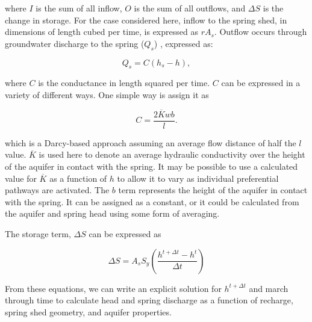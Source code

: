 \documentclass[11pt]{amsart}
\begin{document}
\noindent where $I$ is the sum of all inflow, $O$ is the sum of all outflows, and $\Delta S$ is the change in storage.  For the case considered here, inflow to the spring shed, in dimensions of length cubed per time, is expressed as $r A_s$.  Outflow occurs through groundwater discharge to the spring ($Q_s$) , expressed as:

\begin{equation}
Q_s = C \left ( h_s - h \right ),
\end{equation}

\noindent where $C$ is the conductance in length squared per time.  $C$ can be expressed in a variety of different ways.  One simple way is assign it as

\begin{equation}
C = \frac{2 \overline{K} w b}{l}.
\end{equation}

\noindent which is a Darcy-based approach assuming an average flow distance of half the $l$ value.  $\overline{K}$ is used here to denote an average hydraulic conductivity over the height of the aquifer in contact with the spring.  It may be possible to use a calculated value for $\overline{K}$ as a function of $h$ to allow it to vary as individual preferential pathways are activated.  The $b$ term represents the height of the aquifer in contact with the spring.  It can be assigned as a constant, or it could be calculated from the aquifer and spring head using some form of averaging.

The storage term, $\Delta S$ can be expressed as

\begin{equation}
\Delta S = A_s S_y \left ( \frac{h^{t + \Delta t} - h^t}{\Delta t} \right )
\end{equation}

From these equations, we can write an explicit solution for $h^{t + \Delta t}$ and march through time to calculate head and spring discharge as a function of recharge, spring shed geometry, and aquifer properties.



\end{document}
